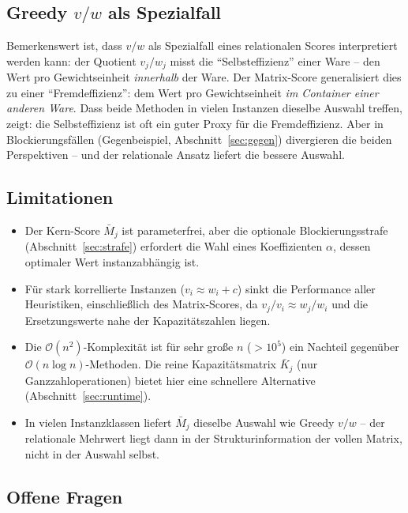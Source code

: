 \documentclass[a4paper,11pt]{article}
\begin{document}
\subsection{Greedy $v/w$ als Spezialfall}

Bemerkenswert ist, dass $v/w$ als Spezialfall eines
relationalen Scores interpretiert werden kann: der
Quotient $v_j/w_j$ misst die ``Selbsteffizienz'' einer
Ware -- den Wert pro Gewichtseinheit \emph{innerhalb}
der Ware. Der Matrix-Score generalisiert dies zu einer
``Fremdeffizienz'': dem Wert pro Gewichtseinheit
\emph{im Container einer anderen Ware}.
Dass beide Methoden in vielen Instanzen dieselbe Auswahl
treffen, zeigt: die Selbsteffizienz ist oft ein guter
Proxy für die Fremdeffizienz. Aber in Blockierungsfällen
(Gegenbeispiel, Abschnitt~\ref{sec:gegen}) divergieren
die beiden Perspektiven -- und der relationale Ansatz
liefert die bessere Auswahl.

\subsection{Limitationen}

\begin{itemize}[leftmargin=*,topsep=2pt]
  \item Der Kern-Score $\bar{M}_j$ ist parameterfrei, aber die
    optionale Blockierungsstrafe (Abschnitt~\ref{sec:strafe})
    erfordert die Wahl eines Koeffizienten $\alpha$, dessen
    optimaler Wert instanzabhängig ist.
  \item Für stark korrellierte Instanzen ($v_i \approx w_i + c$)
    sinkt die Performance aller Heuristiken, einschließlich des
    Matrix-Scores, da $v_j/v_i \approx w_j/w_i$ und die
    Ersetzungswerte nahe der Kapazitätszahlen liegen.
  \item Die $\mathcal{O}(n^2)$-Komplexität ist für sehr große $n$
    ($> 10^5$) ein Nachteil gegenüber $\mathcal{O}(n \log n)$-Methoden.
    Die reine Kapazitätsmatrix $\bar{K}_j$
    (nur Ganzzahloperationen) bietet hier eine schnellere
    Alternative (Abschnitt~\ref{sec:runtime}).
  \item In vielen Instanzklassen liefert $\bar{M}_j$ dieselbe
    Auswahl wie Greedy $v/w$ -- der relationale Mehrwert liegt
    dann in der Strukturinformation der vollen Matrix, nicht
    in der Auswahl selbst.
\end{itemize}

\subsection{Offene Fragen}
\end{document}
